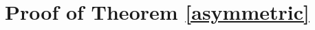 \documentclass[11pt, a4paper]{article}
\theoremstyle{compact}
\newtheorem{definition}[theorem]{Definition}
\begin{document}
\section{Proof of Theorem \ref{asymmetric} }
\end{document}
